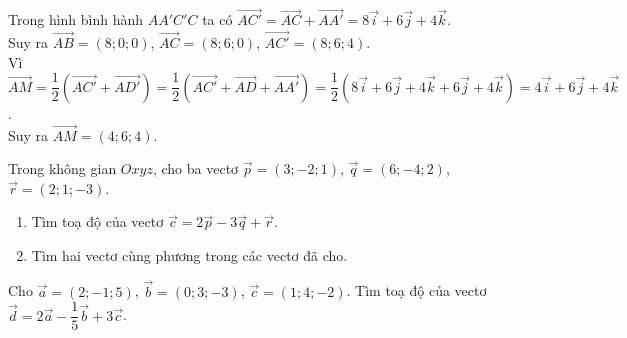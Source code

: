 \begin{bt}
{		Trong hình bình hành $AA'C'C$ ta có  $\overrightarrow{AC'}=\overrightarrow{AC}+\overrightarrow{AA'}=8\overrightarrow{i}+6\overrightarrow{j}+4\overrightarrow{k}$.\\
		Suy ra  $\overrightarrow{AB}=(8;0;0)$, $\overrightarrow{AC}=(8;6;0)$, $\overrightarrow{AC'}=(8;6;4)$.\\
		Vì  $\overrightarrow{AM}=\dfrac{1}{2}\left(\overrightarrow{AC'}+\overrightarrow{AD'}\right)=\dfrac{1}{2}\left(\overrightarrow{AC'}+\overrightarrow{AD}+\overrightarrow{AA'}\right)=\dfrac{1}{2}\left(8\overrightarrow{i}+6\overrightarrow{j}+4\overrightarrow{k}+6\overrightarrow{j}+4\overrightarrow{k}\right)=4\overrightarrow{i}+6\overrightarrow{j}+4\overrightarrow{k}$.\\
		Suy ra  $\overrightarrow{AM}=(4;6;4)$.
	} 
\end{bt}

\begin{bt}%
	 Trong không gian $Oxyz$, cho ba vectơ $\overrightarrow{p}=(3;-2;1)$, $\overrightarrow{q}=(6;-4;2)$, $\overrightarrow{r}=(2;1;-3)$.
	\begin{enumerate}
		\item  Tìm toạ độ của vectơ $\overrightarrow{c}=2\overrightarrow{p}-3\overrightarrow{q}+\overrightarrow{r}$.
		\item Tìm hai vectơ cùng phương  trong các vectơ đã cho.
	\end{enumerate}
\end{bt}

\begin{bt}%
	Cho $\overrightarrow{a}=(2;-1;5)$, $\overrightarrow{b}=(0;3;-3)$, $\overrightarrow{c}=(1;4;-2)$.  Tìm toạ độ của vectơ $\overrightarrow{d} =2\overrightarrow{a}-\dfrac{1}{5}\overrightarrow{b}+3\overrightarrow{c}$.
\end{bt}


